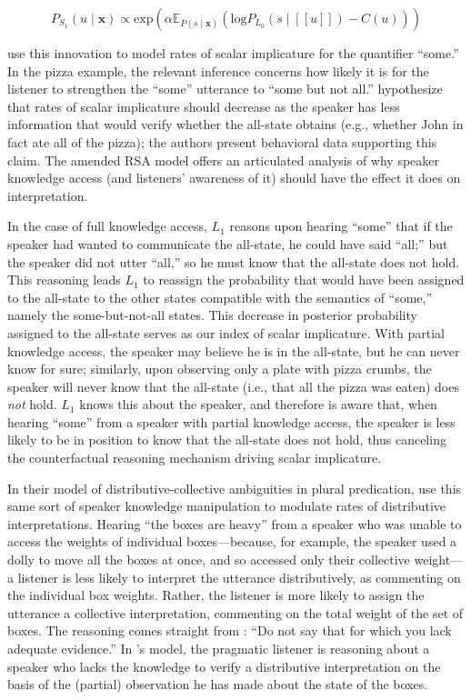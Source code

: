 \documentclass{sp}
\newcommand{\sem}[1]{\ensuremath{[\![#1]\!]}}
\begin{document}
\begin{equation} \label{S1-epistemic}
P_{S_1}(u\mid \textbf{x}) \propto \textrm{exp}(\alpha \mathbb{E}_{P(s\mid \textbf{x})}(\textrm{log}P_{L_0}(s\mid \sem{u}) - C(u)))
\end{equation}


\cite{goodmanstuhlmuller2013} use this innovation to model rates of scalar implicature for the quantifier ``some.'' In the pizza example, the relevant inference concerns how likely it is for the listener to strengthen the ``some'' utterance to ``some but not all.'' \citeauthor{goodmanstuhlmuller2013} hypothesize that rates of scalar implicature should decrease as the speaker has less information that would verify whether the all-state obtains (e.g., whether John in fact ate all of the pizza); the authors present behavioral data supporting this claim. The amended RSA model offers an articulated analysis of why speaker knowledge access (and listeners' awareness of it) should have the effect it does on interpretation. 

In the case of full knowledge access, $L_1$ reasons upon hearing ``some'' that if the speaker had wanted to communicate the all-state, he could have said ``all;'' but the speaker did not utter ``all,'' so he must know that the all-state does not hold. This reasoning leads $L_1$ to reassign the probability that would have been assigned to the all-state to the other states compatible with the semantics of ``some,'' namely the some-but-not-all states. This decrease in posterior probability assigned to the all-state serves as our index of scalar implicature. With partial knowledge access, the speaker may believe he is in the all-state, but he can never know for sure; similarly, upon observing only a plate with pizza crumbs, the speaker will never know that the all-state (i.e., that all the pizza was eaten) does \emph{not} hold. $L_1$ knows this about the speaker, and therefore is aware that, when hearing ``some'' from a speaker with partial knowledge access, the speaker is less likely to be in position to know that the all-state does not hold, thus canceling the counterfactual reasoning mechanism driving scalar implicature.

In their model of distributive-collective ambiguities in plural predication, \cite{scontrasgoodman2017} use this same sort of speaker knowledge manipulation to modulate rates of distributive interpretations. Hearing ``the boxes are heavy'' from a speaker who was unable to access the weights of individual boxes---because, for example, the speaker used a dolly to move all the boxes at once, and so accessed only their collective weight---a listener is less likely to interpret the utterance distributively, as commenting on the individual box weights. Rather, the listener is more likely to assign the utterance a collective interpretation, commenting on the total weight of the set of boxes. The reasoning comes straight from \cite{Grice1975:Logic-and-Conve}: ``Do not say that for which you lack adequate evidence.'' In \citeauthor{scontrasgoodman2017}'s model, the pragmatic listener is reasoning about a speaker who lacks the knowledge to verify a distributive interpretation on the basis of the (partial) observation he has made about the state of the boxes.
\end{document}
